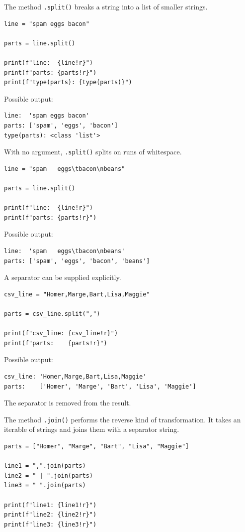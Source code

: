 The method \texttt{.split()} breaks a string into a list of smaller strings.

\begin{verbatim}
line = "spam eggs bacon"

parts = line.split()

print(f"line:  {line!r}")
print(f"parts: {parts!r}")
print(f"type(parts): {type(parts)}")
\end{verbatim}

Possible output:

\begin{verbatim}
line:  'spam eggs bacon'
parts: ['spam', 'eggs', 'bacon']
type(parts): <class 'list'>
\end{verbatim}

With no argument, \texttt{.split()} splits on runs of whitespace.

\begin{verbatim}
line = "spam   eggs\tbacon\nbeans"

parts = line.split()

print(f"line:  {line!r}")
print(f"parts: {parts!r}")
\end{verbatim}

Possible output:

\begin{verbatim}
line:  'spam   eggs\tbacon\nbeans'
parts: ['spam', 'eggs', 'bacon', 'beans']
\end{verbatim}

A separator can be supplied explicitly.

\begin{verbatim}
csv_line = "Homer,Marge,Bart,Lisa,Maggie"

parts = csv_line.split(",")

print(f"csv_line: {csv_line!r}")
print(f"parts:    {parts!r}")
\end{verbatim}

Possible output:

\begin{verbatim}
csv_line: 'Homer,Marge,Bart,Lisa,Maggie'
parts:    ['Homer', 'Marge', 'Bart', 'Lisa', 'Maggie']
\end{verbatim}

The separator is removed from the result.

The method \texttt{.join()} performs the reverse kind of transformation. It takes an iterable of strings and joins them with a separator string.

\begin{verbatim}
parts = ["Homer", "Marge", "Bart", "Lisa", "Maggie"]

line1 = ",".join(parts)
line2 = " | ".join(parts)
line3 = " ".join(parts)

print(f"line1: {line1!r}")
print(f"line2: {line2!r}")
print(f"line3: {line3!r}")
\end{verbatim}

